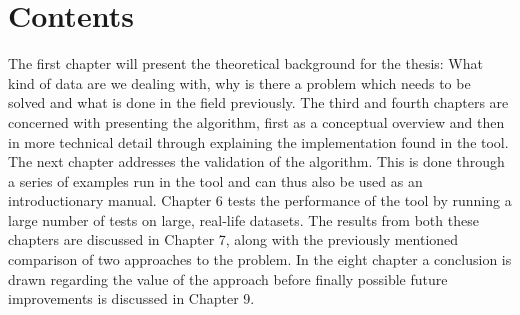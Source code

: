 \documentclass[thesis.tex]{subfiles}
\begin{document}
\section{Contents}
The first chapter will present the theoretical background for the thesis: What kind of data are we dealing with, why is there a problem which needs to be solved and what is done in the field previously. The third and fourth chapters are concerned with presenting the algorithm, first as a conceptual overview and then in more technical detail through explaining the implementation found in the tool. The next chapter addresses the validation of the algorithm. This is done through a series of examples run in the tool and can thus also be used as an introductionary manual. Chapter 6 tests the performance of the tool by running a large number of tests on large, real-life datasets. The results from both these chapters are discussed in Chapter 7, along with the previously mentioned comparison of two approaches to the problem. In the eight chapter a conclusion is drawn regarding the value of the approach before finally possible future improvements is discussed in Chapter 9.
\end{document}
